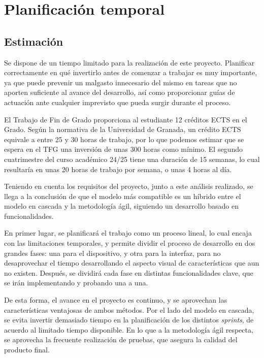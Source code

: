 \chapter{Planificación temporal}

\section{Estimación}

Se dispone de un tiempo limitado para la realización de este proyecto. Planificar correctamente en qué invertirlo antes de comenzar a trabajar es muy importante, ya que puede prevenir un malgasto innecesario del mismo en tareas que no aporten suficiente al avance del desarrollo, así como proporcionar guías de actuación ante cualquier imprevisto que pueda surgir durante el proceso.

El Trabajo de Fin de Grado proporciona al estudiante 12 créditos ECTS en el Grado. Según la normativa de la Universidad de Granada, un crédito ECTS equivale a entre 25 y 30 horas de trabajo, por lo que podemos estimar que se espera en el TFG una inversión de unas 300 horas como mínimo. El segundo cuatrimestre del curso académico 24/25 tiene una duración de 15 semanas, lo cual resultaría en unas 20 horas de trabajo por semana, o unas 4 horas al día.

Teniendo en cuenta los requisitos del proyecto, junto a este análisis realizado, se llega a la conclusión de que el modelo más compatible es un híbrido entre el modelo en cascada y la metodología ágil, siguiendo un desarrollo basado en funcionalidades.

En primer lugar, se planificará el trabajo como un proceso lineal, lo cual encaja con las limitaciones temporales, y permite dividir el proceso de desarrollo en dos grandes fases: una para el dispositivo, y otra para la interfaz, para no desaprovechar el tiempo desarrollando el aspecto visual de características que aun no existen. Después, se dividirá cada fase en distintas funcionalidades clave, que se irán implementando y probando una a una.

De esta forma, el avance en el proyecto es continuo, y se aprovechan las características ventajosas de ambos métodos. Por el lado del modelo en cascada, se evita invertir demasiado tiempo en la planificación de los distintos \textit{sprints}, de acuerdo al limitado tiempo disponible. En lo que a la metodología ágil respecta, se aprovecha la frecuente realización de pruebas, que asegura la calidad del producto final.

